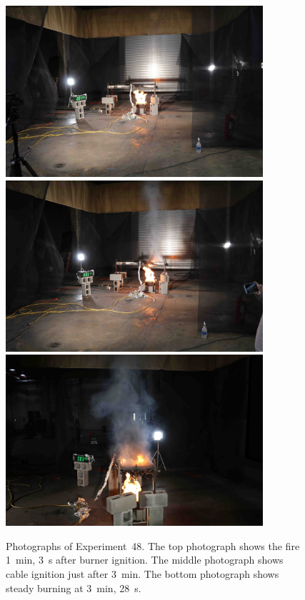 \begin{figure}[p]
\centering
\includegraphics[height=2.50in]{../FIGURES/Test_48_1_min_3_s} \\ \vspace{0.1in}
\includegraphics[height=2.50in]{../FIGURES/Test_48_3_min_11_s} \\ \vspace{0.1in}
\includegraphics[height=2.50in]{../FIGURES/Test_48_3_min_28_s}
\caption[Photographs of Experiment~48]{Photographs of Experiment~48. The top photograph shows the fire 1~min, 3~s after burner ignition. The middle photograph shows cable ignition just after 3~min. The bottom photograph shows steady burning at 3~min, 28~s.}
\label{fig:Test_48_photos}
\end{figure}


